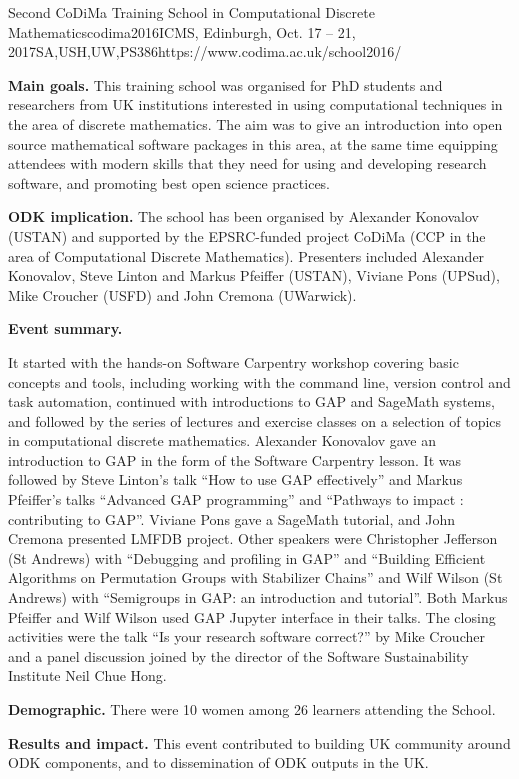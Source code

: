 \begin{event}{Second CoDiMa Training School in Computational Discrete Mathematics}{codima2016}{ICMS, Edinburgh, Oct. 17 -- 21, 2017}{SA,USH,UW,PS}{38}{6}{https://www.codima.ac.uk/school2016/}

\textbf{Main goals.} This training school was organised for PhD students and researchers from
UK institutions interested in using computational techniques in the area of discrete mathematics.
The aim was to give an introduction into open source mathematical software packages in this area,
at the same time equipping attendees with modern skills that they need for using and developing
research software, and promoting best open science practices.

\textbf{ODK implication.} The school has been organised by Alexander Konovalov (USTAN) and supported
by the EPSRC-funded project CoDiMa (CCP in the area of Computational Discrete Mathematics). Presenters
included Alexander Konovalov, Steve Linton and Markus Pfeiffer (USTAN), Viviane Pons (UPSud),
Mike Croucher (USFD) and John Cremona (UWarwick). 

\textbf{Event summary.}

It started with the hands-on Software Carpentry workshop covering basic
concepts and tools, including working with the command line, version control and task automation,
continued with introductions to GAP and SageMath systems, and followed by the series of lectures
and exercise classes on a selection of topics in computational discrete mathematics. Alexander
Konovalov gave an introduction to GAP in the form of the Software Carpentry lesson. It was
followed by Steve Linton's talk ``How to use GAP effectively'' and Markus Pfeiffer's talks
``Advanced GAP programming'' and ``Pathways to impact : contributing to GAP''.
Viviane Pons gave a SageMath tutorial, and John Cremona presented LMFDB project. 
Other speakers were Christopher Jefferson (St Andrews) with 
``Debugging and profiling in GAP'' and 
``Building Efficient Algorithms on Permutation Groups with Stabilizer Chains''
and Wilf Wilson (St Andrews) with ``Semigroups in GAP: an introduction and tutorial''.
Both Markus Pfeiffer and Wilf Wilson used GAP Jupyter interface in their talks.
The closing activities were the talk ``Is your research software correct?'' by Mike Croucher 
and a panel discussion joined by the director of the Software Sustainability Institute Neil Chue Hong.

\textbf{Demographic.} There were 10 women among 26 learners attending the School.

\textbf{Results and impact.} This event contributed to building UK community
around ODK components, and to dissemination of ODK outputs in the UK.

\end{event}